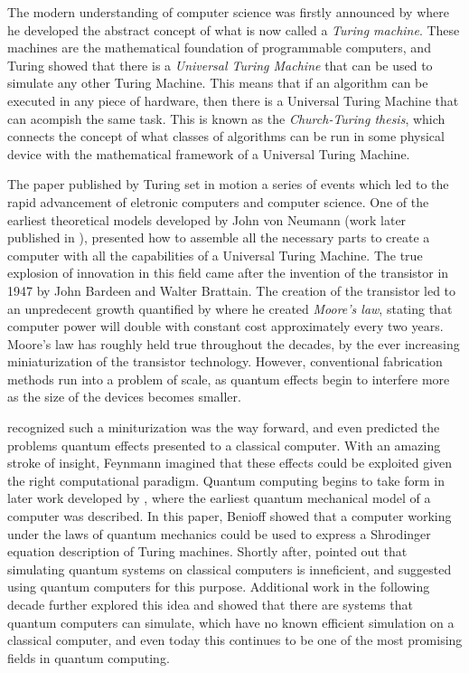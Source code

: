 \documentclass[../../dissertation.tex]{subfiles}
\begin{document}
The modern understanding of computer science was firstly announced by \cite{turing1936} where he developed the abstract concept of what is now called a \textit{Turing machine}. These machines are the mathematical foundation of programmable computers, and Turing showed that there is a \textit{Universal Turing Machine} that can be used to simulate any other Turing Machine. This means that if an algorithm can be executed in any piece of hardware, then there is a Universal Turing Machine that can acompish the same task. This is known as the \textit{Church-Turing thesis}, which connects the concept of what classes of algorithms can be run in some physical device with the mathematical framework of a Universal Turing Machine.\par
The paper published by Turing set in motion a series of events which led to the rapid advancement of eletronic computers and computer science. One of the earliest theoretical models developed by John von Neumann (work later published in \cite{Neumann93} ), presented how to assemble all the necessary parts to create a computer with all the capabilities of a Universal Turing Machine. The true explosion of innovation in this field came after the invention of the transistor in 1947 by John Bardeen and Walter Brattain. The creation of the transistor led to an unpredecent growth quantified by  \cite{moore1965} where he created \textit{Moore's law}, stating that computer power will double with constant cost approximately every two years. Moore's law has roughly held true throughout the decades, by the ever increasing miniaturization of the transistor technology. However, conventional fabrication methods run into a problem of scale, as quantum effects begin to interfere more as the size of the devices becomes smaller.\par
\cite{feynman1959} recognized such a miniturization was the way forward, and even predicted the problems quantum effects presented to a classical computer. With an amazing stroke of insight, Feynmann imagined that these effects could be exploited given the right computational paradigm. Quantum computing begins to take form in later work developed by \cite{benioff1980}, where the earliest quantum mechanical model of a computer was described. In this paper, Benioff showed that a computer working under the laws of quantum mechanics could be used to express a Shrodinger equation description of Turing machines. Shortly after, \cite{feynman1982} pointed out that simulating quantum systems on classical computers is inneficient, and suggested using quantum computers for this purpose. Additional work in the following decade further explored this idea and showed that there are systems that quantum computers can simulate, which have no known efficient simulation on a classical computer, and even today this continues to be one of the most promising fields in quantum computing.\par
\end{document}
